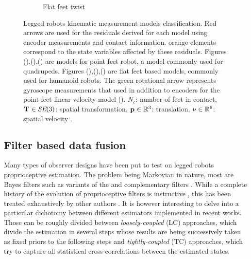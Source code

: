 \begin{figure}
\begin{subfigure}{.33\linewidth}
        \caption{Flat feet twist}
        \label{fig:kin_flat_vel}
    \end{subfigure}%
    \caption{Legged robots kinematic measurement models classification. Red arrows are used for the residuals derived for each model using encoder measurements and contact information. 
    orange elements correspond to the state variables affected by these residuals. Figures (),(),() are models
    for point feet robot, a model commonly used for quadrupeds. Figures (),(),() are flat feet based models,
    commonly used for humanoid robots. The green rotational arrow represents gyroscope measurements that used in addition to encoders for the point-feet linear velocity model ().
    $N_c$: number of feet in contact, $\prescript{}{}{{\bf T}}_{} \in \textit{SE}(3)$: spatial transformation, $\prescript{}{}{{\bf p}}_{} \in \mathbb{R}^3$: translation, $\nu \in \mathbb{R}^6$: spatial velocity \cite{featherstone2014rigid}. 
        }
    \label{fig:kin_models}
\end{figure}


\subsection{Filter based data fusion}
\label{sec:proprio_filters}

Many types of observer designs have been put to test on legged robots proprioceptive estimation. The problem being Markovian in nature,
most are Bayes filters such as variants of the \KalmanF \cite{kalman1960new} and complementary filters \cite{higgins1975comparison}. While a complete history of 
the evolution of proprioceptive filters is instructive 
\cite{gassmann2005localization, lin2005leg, lin2006sensor, cobano2008location, aoustin2008experimental, lebastard2011estimation, chilian2011multisensor, reinstein2011dead, 
gur2012model, ma2012robust, gorner2013leg}, 
this has been treated exhaustively by other authors \cite{bloesch2017state, camurri2017multisensory}. 
It is however interesting to delve into a particular dichotomy between different estimators implemented in recent works. Those can be 
roughly divided between \textit{loosely-coupled} (LC) approaches, which divide the estimation in several steps whose results are being successively taken as fixed priors to the 
following steps and \textit{tightly-coupled} (TC) approaches, which try to capture all statistical cross-correlations between the estimated states.


